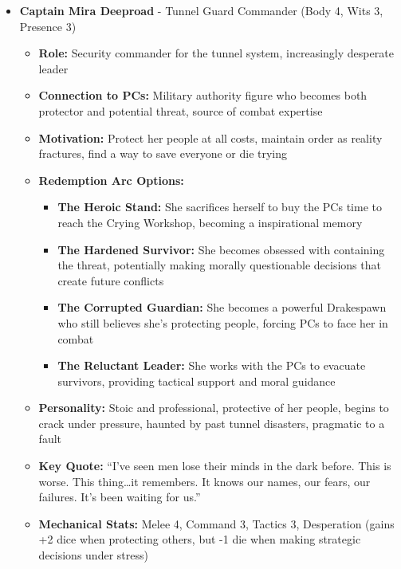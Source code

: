\documentclass[11pt]{article}
\begin{document}
\begin{itemize}
\item \textbf{Captain Mira Deeproad} - Tunnel Guard Commander (Body 4, Wits 3, Presence 3)
  \begin{itemize}
  \item \textbf{Role:} Security commander for the tunnel system, increasingly desperate leader
  \item \textbf{Connection to PCs:} Military authority figure who becomes both protector and potential threat, source of combat expertise
  \item \textbf{Motivation:} Protect her people at all costs, maintain order as reality fractures, find a way to save everyone or die trying
  \item \textbf{Redemption Arc Options:}
    \begin{itemize}
    \item \textbf{The Heroic Stand:} She sacrifices herself to buy the PCs time to reach the Crying Workshop, becoming a inspirational memory
    \item \textbf{The Hardened Survivor:} She becomes obsessed with containing the threat, potentially making morally questionable decisions that create future conflicts
    \item \textbf{The Corrupted Guardian:} She becomes a powerful Drakespawn who still believes she's protecting people, forcing PCs to face her in combat
    \item \textbf{The Reluctant Leader:} She works with the PCs to evacuate survivors, providing tactical support and moral guidance
    \end{itemize}
  \item \textbf{Personality:} Stoic and professional, protective of her people, begins to crack under pressure, haunted by past tunnel disasters, pragmatic to a fault
  \item \textbf{Key Quote:} ``I've seen men lose their minds in the dark before. This is worse. This thing\dots it remembers. It knows our names, our fears, our failures. It's been waiting for us.''
  \item \textbf{Mechanical Stats:} Melee 4, Command 3, Tactics 3, Desperation (gains +2 dice when protecting others, but -1 die when making strategic decisions under stress)
  \end{itemize}
\end{itemize}
\end{document}
